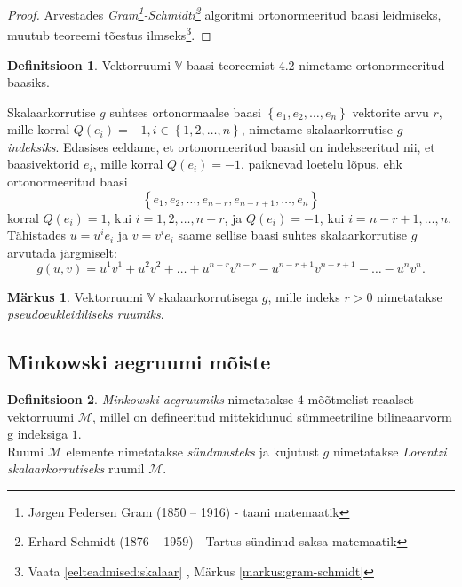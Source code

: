 \documentclass[a4paper,12pt]{article}
\theoremstyle{plain}
\theoremstyle{definition}
\newtheorem{definitsioon}{Definitsioon}[section]
\newtheorem{markus}{Märkus}[section]
\numberwithin{equation}{section}
\begin{document}
\begin{proof}
Arvestades \textit{Gram\footnote{Jørgen Pedersen Gram (1850 – 1916) - taani matemaatik}-Schmidti\footnote{Erhard Schmidt (1876 – 1959) - Tartus sündinud saksa matemaatik}} algoritmi ortonormeeritud baasi leidmiseks, muutub teoreemi tõestus ilmseks\footnote{Vaata \ref{eelteadmised:skalaar} , Märkus \ref{markus:gram-schmidt}}.
\end{proof}

\begin{definitsioon}
Vektorruumi $\mathbb{V}$ baasi teoreemist 4.2 nimetame ortonormeeritud baasiks.
\end{definitsioon}

Skalaarkorrutise $g$ suhtses ortonormaalse baasi $\left\lbrace e_1, e_2, \dots, e_n \right\rbrace$ vektorite arvu $r$, mille korral $Q \left(e_i\right) = -1, i \in \left\lbrace 1, 2, \dots, n \right\rbrace$, nimetame skalaarkorrutise $g$ \emph{indeksiks}.
Edasises eeldame, et ortonormeeritud baasid on indekseeritud nii, et baasivektorid $e_i$, mille korral $Q \left(e_i\right) = -1$, paiknevad loetelu lõpus, ehk ortonormeeritud baasi 
\[\left\lbrace e_1, e_2, \dots, e_{n-r}, e_{n-r+1}, \dots, e_n \right\rbrace\]
korral $Q \left(e_i\right) = 1$, kui $i = 1, 2, \dots, n-r$, ja $Q \left(e_i\right) = -1$, kui $i = n-r+1, \dots, n$. Tähistades $u = u^i e_i$ ja $v = v^i e_i$ saame sellise baasi suhtes skalaarkorrutise $g$ arvutada järgmiselt:
\[g\left(u, v\right) = u^1 v^1 + u^2 v^2 + \dots + u^{n-r} v^{n-r} - u^{n-r+1} v^{n-r+1} - \dots - u^n v^n.\]

\begin{markus}
Vektorruumi $\mathbb{V}$ skalaarkorrutisega $g$, mille indeks $r > 0$ nimetatakse \emph{pseudoeukleidiliseks ruumiks}.
\end{markus}


\subsection{Minkowski aegruumi mõiste}

\begin{definitsioon}
\emph{Minkowski aegruumiks} nimetatakse $4$-mõõtmelist reaalset vektorruumi $\mathcal{M}$, millel on defineeritud mittekidunud sümmeetriline bilineaarvorm g indeksiga $1$. \\
Ruumi $\mathcal{M}$ elemente nimetatakse \emph{sündmusteks} ja kujutust $g$ nimetatakse \emph{Lorentzi skalaarkorrutiseks} ruumil $\mathcal{M}$.
\end{definitsioon}
\end{document}
